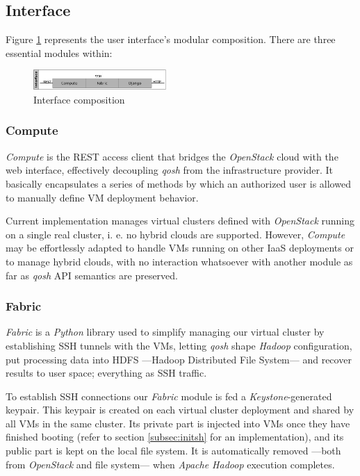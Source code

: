 \documentclass{sig-alternate}
\begin{document}
\subsection{Interface}
\noindent Figure \ref{fig:interface} represents the user interface's modular composition. There are three essential modules within:

\begin{figure}[tbp]
\centering
\includegraphics[width=0.45\textwidth]{img/003}
\caption{Interface composition}
\label{fig:interface}
\end{figure}


\subsubsection{Compute}
\noindent \emph{Compute} is the REST access client that bridges the \emph{OpenStack} cloud with the web interface, effectively decoupling \emph{qosh} from the infrastructure provider. It basically encapsulates a series of methods by which an authorized user is allowed to manually define VM deployment behavior.

Current implementation manages virtual clusters defined with \emph{OpenStack} running on a single real cluster, i. e. no hybrid clouds are supported. However, \emph{Compute} may be effortlessly adapted to handle VMs running on other IaaS deployments or to manage hybrid clouds, with no interaction whatsoever with another module as far as \emph{qosh} API semantics are preserved.


\subsubsection{Fabric}
\noindent \emph{Fabric} is a \emph{Python} library used to simplify managing our virtual cluster by establishing SSH tunnels with the VMs, letting \emph{qosh} shape \emph{Hadoop} configuration, put processing data into HDFS ---Hadoop Distributed File System--- and recover results to user space; everything as SSH traffic.

To establish SSH connections our \emph{Fabric} module is fed a \emph{Keystone}-generated keypair. This keypair is created on each virtual cluster deployment and shared by all VMs in the same cluster. Its private part is injected into VMs once they have finished booting (refer to section \ref{subsec:initsh} for an implementation), and its public part is kept on the local file system. It is automatically removed ---both from \emph{OpenStack} and file system--- when \emph{Apache Hadoop} execution completes.
\end{document}
